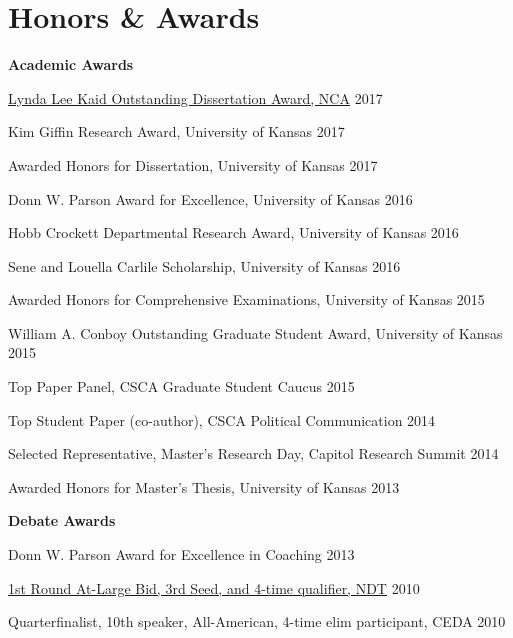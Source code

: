
\section{Honors \& \hspace{5mm} Awards}
\textbf{Academic Awards}
  \begin{innerlist}
    \item \href{https://www.natcom.org/awards/political-communication-division}{Lynda Lee Kaid Outstanding Dissertation Award, NCA} \hfill 2017
    \item Kim Giffin Research Award, University of Kansas                            \hfill 2017
    \item Awarded Honors for Dissertation, University of Kansas                      \hfill 2017
    \item Donn W. Parson Award for Excellence, University of Kansas                  \hfill 2016
    \item Hobb Crockett Departmental Research Award, University of Kansas            \hfill 2016
    \item Sene and Louella Carlile Scholarship, University of Kansas                 \hfill 2016
    \item Awarded Honors for Comprehensive Examinations, University of Kansas        \hfill 2015
    \item William A. Conboy Outstanding Graduate Student Award, University of Kansas \hfill 2015
    \item Top Paper Panel, CSCA Graduate Student Caucus                              \hfill 2015
    \item Top Student Paper (co-author), CSCA Political Communication                \hfill 2014
    \item Selected Representative, Master's Research Day, Capitol Research Summit    \hfill 2014
    \item Awarded Honors for Master's Thesis, University of Kansas                   \hfill 2013
  \end{innerlist}\vspace{1em}

\textbf{Debate Awards}
  \begin{innerlist}
    \item Donn W. Parson Award for Excellence in Coaching                            \hfill 2013
    \item \href{http://www.cedadebate.org/forum/index.php?topic=474.0}{1st Round At-Large Bid, 3rd Seed, and 4-time qualifier, NDT} \hfill 2010
    \item Quarterfinalist, 10th speaker, All-American, 4-time elim participant, CEDA \hfill 2010
  \end{innerlist}\vspace{-.075in}
